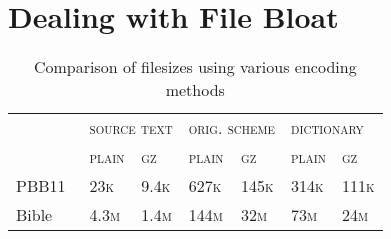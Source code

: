 \chapter{Dealing with File Bloat}\label{ch:bloat}


\begin{table}
    \myfloatalign
  \begin{tabularx}{\textwidth}{lXXXXXX} %
    & \multicolumn{2}{l}{\textsc{source text}} & \multicolumn{2}{l}{\textsc{orig. scheme}} & \multicolumn{2}{l}{\textsc{dictionary}} \\
    & \textsc{plain} & \textsc{gz} & \textsc{plain} & \textsc{gz} & \textsc{plain} & \textsc{gz} \\ \midrule
    PBB11~\cite{Pinkney2011} & 23\textsc{k} & 9.4\textsc{k} & 627\textsc{k} & 145\textsc{k} & 314\textsc{k} & 111\textsc{k} \\ \midrule
    Bible & 4.3\textsc{m} & 1.4\textsc{m} & 144\textsc{m} & 32\textsc{m} & 73\textsc{m} & 24\textsc{m} \\ 
    \bottomrule
  \end{tabularx}
  \caption[Comparison of filesizes]{Comparison of filesizes using various encoding methods}  \label{tab:filesize}
\end{table}